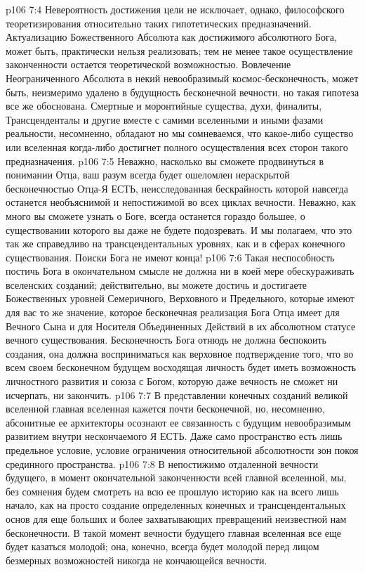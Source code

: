 \vs p106 7:4 Невероятность достижения цели не исключает, однако, философского теоретизирования относительно таких гипотетических предназначений. Актуализацию Божественного Абсолюта как достижимого абсолютного Бога, может быть, практически нельзя реализовать; тем не менее такое осуществление законченности остается теоретической возможностью. Вовлечение Неограниченного Абсолюта в некий невообразимый космос\hyp{}бесконечность, может быть, неизмеримо удалено в будущность бесконечной вечности, но такая гипотеза все же обоснована. Смертные и моронтийные существа, духи, финалиты, Трансценденталы и другие вместе с самими вселенными и иными фазами реальности, несомненно, обладают   но мы сомневаемся, что какое\hyp{}либо существо или вселенная когда\hyp{}либо достигнет полного осуществления всех сторон такого предназначения.
\vs p106 7:5 \pc Неважно, насколько вы сможете продвинуться в понимании Отца, ваш разум всегда будет ошеломлен нераскрытой бесконечностью Отца\hyp{}Я ЕСТЬ, неисследованная бескрайность которой навсегда останется необъяснимой и непостижимой во всех циклах вечности. Неважно, как много вы сможете узнать о Боге, всегда останется гораздо большее, о существовании которого вы даже не будете подозревать. И мы полагаем, что это так же справедливо на трансцендентальных уровнях, как и в сферах конечного существования. Поиски Бога не имеют конца!
\vs p106 7:6 Такая неспособность постичь Бога в окончательном смысле не должна ни в коей мере обескураживать вселенских созданий; действительно, вы можете достичь и достигаете Божественных уровней Семеричного, Верховного и Предельного, которые имеют для вас то же значение, которое бесконечная реализация Бога Отца имеет для Вечного Сына и для Носителя Объединенных Действий в их абсолютном статусе вечного существования. Бесконечность Бога отнюдь не должна беспокоить создания, она должна восприниматься как верховное подтверждение того, что во всем своем бесконечном будущем восходящая личность будет иметь возможность личностного развития и союза с Богом, которую даже вечность не сможет ни исчерпать, ни закончить.
\vs p106 7:7 \pc В представлении конечных созданий великой вселенной главная вселенная кажется почти бесконечной, но, несомненно, абсонитные ее архитекторы осознают ее связанность с будущим невообразимым развитием внутри нескончаемого Я ЕСТЬ. Даже само пространство есть лишь предельное условие, условие ограничения  относительной абсолютности зон покоя срединного пространства.
\vs p106 7:8 В непостижимо отдаленной вечности будущего, в момент окончательной законченности всей главной вселенной, мы, без сомнения будем смотреть на всю ее прошлую историю как на всего лишь начало, как на просто создание определенных конечных и трансцендентальных основ для еще больших и более захватывающих превращений неизвестной нам бесконечности. В такой момент вечности будущего главная вселенная все еще будет казаться молодой; она, конечно, всегда будет молодой перед лицом безмерных возможностей никогда не кончающейся вечности.
